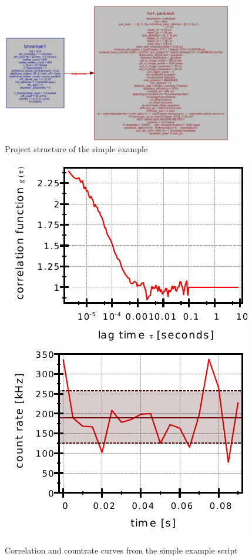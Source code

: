 \begin{figure}[t!]
	\centering
		\includegraphics[width=0.9\textwidth]{pic/simplexample_struc.png}
	\caption{Project structure of the simple example}
	\label{fig:simplexample_struc}
\end{figure}
\begin{figure}[b!]
	\centering
		\includegraphics{pic/simplexample.pdf}
		\includegraphics{pic/simplexample_cnt.pdf}
	\caption{Correlation and countrate curves from the simple example script}
	\label{fig:simplexample}
\end{figure}

